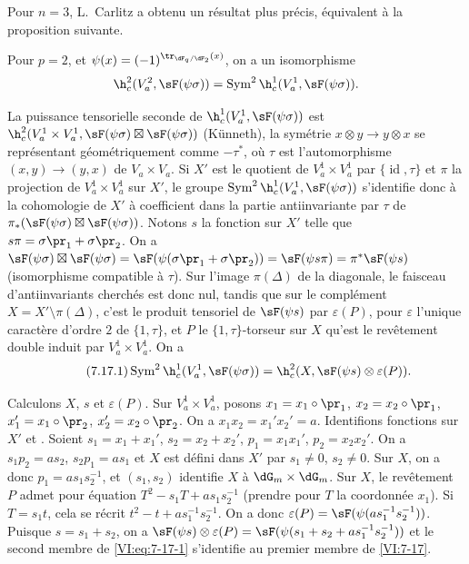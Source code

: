 Pour $n=3$, L.\ Carlitz \cite{ca69-2} a obtenu un résultat plus précis, 
équivalent à la proposition suivante. 





\begin{proposition_}\label{VI:7-17}
Pour $p=2$, et $\psi(x)=(-1)^{\tr_{\dF_q/\dF_2}(x)}$, on a un isomorphisme 
\[
  \h_c^2(V_a^2,\sF(\psi\sigma)) = \operatorname{Sym}^2 \h_c^1(V_a^1,\sF(\psi\sigma)) \text{.} 
\]
\end{proposition_}

La puissance tensorielle seconde de $\h_c^1(V_a^1,\sF(\psi\sigma))$ est 
$\h_c^2(V_a^1\times V_a^1,\sF(\psi\sigma)\boxtimes \sF(\psi\sigma))$ 
(K\"unneth), la symétrie $x\otimes y\to y\otimes x$ se représentant 
géométriquement comme $-\tau^\ast$, où $\tau$ est l'automorphisme 
$(x,y)\to (y,x)$ de $V_a\times V_a$. Si $X'$ est le quotient de 
$V_a^1\times V_a^1$ par $\{\operatorname{id}{},\tau\}$ et $\pi$ la 
projection de $V_a^1\times V_a^1$ sur $X'$, le groupe 
$\operatorname{Sym}^2 \h_c^1(V_a^1,\sF(\psi\sigma))$ s'identifie donc à la 
cohomologie de $X'$ à coefficient dans la partie antiinvariante par $\tau$ de 
$\pi_\ast(\sF(\psi\sigma)\boxtimes \sF(\psi\sigma))$. Notons $s$ la fonction 
sur $X'$ telle que $s\pi =\sigma\pr_1+\sigma\pr_2$. On a 
$\sF(\psi\sigma)\boxtimes \sF(\psi\sigma) = \sF(\psi(\sigma\pr_1+\sigma\pr_2)) = \sF(\psi s \pi) = \pi^\ast \sF(\psi s)$ 
(isomorphisme compatible à $\tau$). Sur l'image $\pi(\Delta)$ de la 
diagonale, le faisceau d'antiinvariants cherchés est donc nul, tandis que sur 
le complément $X=X'\setminus \pi(\Delta)$, c'est le produit tensoriel de 
$\sF(\psi s)$ par $\varepsilon(P)$, pour $\varepsilon$ l'unique caractère 
d'ordre $2$ de $\{1,\tau\}$, et $P$ le $\{1,\tau\}$-torseur sur $X$ qu'est le 
revêtement double induit par $V_a^1\times V_a^1$. On a 
\begin{equation*}\tag{7.17.1}\label{VI:eq:7-17-1}
  \operatorname{Sym}^2 \h_c^1(V_a^1,\sF(\psi\sigma)) = \h_c^2(X,\sF(\psi s)\otimes \varepsilon(P)) \text{.}
\end{equation*}

Calculons $X$, $s$ et $\varepsilon(P)$. Sur $V_a^1\times V_a^1$, posons 
$x_1=x_1\circ\pr_1$, $x_2=x_2\circ\pr_1$, $x_1'=x_1\circ \pr_2$, 
$x_2'=x_2\circ \pr_2$. On a $x_1 x_2=x_1'x_2'=a$. Identifions fonctions sur 
$X'$ et . Soient $s_1=x_1+x_1'$, 
$s_2=x_2+x_2'$, $p_1=x_1 x_1'$, $p_2=x_2 x_2'$. On a $s_1 p_2 = a s_2$, 
$s_2 p_1 = a s_1$ et $X$ est défini dans $X'$ par $s_1\ne 0$, $s_2\ne 0$. Sur 
$X$, on a donc $p_1 = a s_1 s_2^{-1}$, et $(s_1,s_2)$ identifie $X$ à 
$\dG_m\times \dG_m$. Sur $X$, le revêtement $P$ admet pour équation 
$T^2-s_1 T+a s_1 s_2^{-1}$ (prendre pour $T$ la coordonnée $x_1$). Si 
$T=s_1 t$, cela se récrit $t^2-t+a s_1^{-1} s_2^{-1}$. On a donc 
$\varepsilon(P) = \sF(\psi(a s_1^{-1} s_2^{-1}))$. Puisque $s=s_1+s_2$, on a 
$\sF(\psi s)\otimes \varepsilon(P) = \sF(\psi(s_1+s_2+ a s_1^{-1} s_2^{-1}))$ 
et le second membre de \eqref{VI:eq:7-17-1} s'identifie au premier membre de 
\ref{VI:7-17}. 


